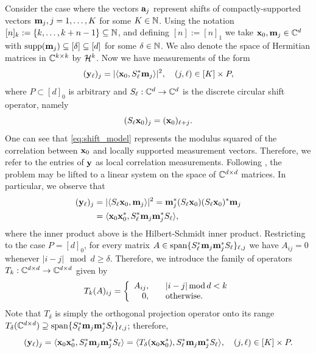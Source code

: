 Consider the case where the vectors $\mathbf a_j$ represent shifts of compactly-supported vectors $\mathbf m_j, j = 1, \ldots, K$ for some $K \in \mathbb{N}$.  Using the notation $[n]_k:=\{k,\ldots,k+n-1\}\subseteq \mathbb{N}$, and defining $[n]:=[n]_1$ we take $\mathbf x_0, \mathbf m_j \in \mathbb{C}^d$ with $\operatorname{supp}(\mathbf m_j)\subseteq[\delta]\subseteq [d]$ for some $\delta \in \mathbb{N}$.  We also denote the space of Hermitian matrices in $\mathbb{C}^{k \times k}$ by $\mathcal{H}^k$.  Now we have measurements of the form \begin{equation} (\mathbf y_\ell)_j = |\langle \mathbf x_0, S^*_\ell \mathbf m_j \rangle|^2, \quad (j, \ell) \in [K] \times P, \label{eq:shift_model} \end{equation} where $P \subset [d]_0$ is arbitrary and $S_\ell : \mathbb{C}^d \to \mathbb{C}^d$ is the discrete circular shift operator, namely \begin{equation*} (S_\ell \mathbf x_0)_j = (\mathbf x_0)_{\ell + j}. \end{equation*}  One can see that \eqref{eq:shift_model} represents the modulus squared of the correlation between $\mathbf x_0$ and locally supported measurement vectors.  Therefore, we refer to the entries of $\mathbf y$ as local correlation measurements.
%
%
Following \cite{candes2012phaselift, IVW2015_FastPhase, balan2006signal}, the problem may be lifted to a linear system on the space of $\mathbb{C}^{d \times d}$ matrices.  In particular, we observe that 
\begin{align*}
	(\mathbf y_\ell)_j &= |\langle S_\ell \mathbf x_0, \mathbf m_j\rangle|^2 = \mathbf m_j^* (S_\ell \mathbf x_0) (S_\ell \mathbf x_0)^* \mathbf m_j \\
	&= \langle \mathbf x_0 \mathbf x_0^*, S_\ell^* \mathbf m_j \mathbf m_j^* S_\ell\rangle,
\end{align*}
where the inner product above is the Hilbert-Schmidt inner product. Restricting to the case $P = [d]_0$,  for every matrix $A \in \mathrm{span}\{S_\ell^* \mathbf m_j \mathbf m_j^* S_\ell\}_{\ell, j}$ we have $A_{ij} = 0$ whenever $|i - j| \mod d \ge \delta$.  Therefore, we introduce the family of operators $T_k : \mathbb{C}^{d \times d} \to \mathbb{C}^{d \times d}$ given by \[T_k(A)_{ij} = \left\{\begin{array}{r@{,\qquad}l} A_{ij} & |i - j| \mod d < k \\ 0 & \text{otherwise}. \end{array}\right.\]  Note that $T_\delta$ is simply the orthogonal projection operator onto its range $T_\delta(\mathbb{C}^{d \times d}) \supseteq \mathrm{span}\{S_\ell^* \mathbf m_j \mathbf m_j^* S_\ell\}_{\ell, j}$; therefore, \begin{equation} (\mathbf y_\ell)_j = \langle \mathbf x_0 \mathbf x_0^*, S_\ell^* \mathbf m_j \mathbf m_j^* S_\ell \rangle = \langle T_{\delta}(\mathbf x_0 \mathbf x_0^*), S_\ell^* \mathbf m_j \mathbf m_j^* S_\ell \rangle, \quad (j, \ell) \in [K] \times P. \label{eq:lifted_system} \end{equation}  

